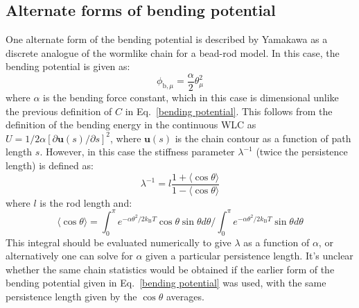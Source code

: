 \documentclass{article}
\begin{document}
\subsection{Alternate forms of bending potential}
One alternate form of the bending potential is described by Yamakawa \cite{Yamakawa2016} as a discrete analogue of the wormlike chain for a bead-rod model.
In this case, the bending potential is given as:
\begin{equation}
\label{bending potential discrete WLC}
    \phi_{\mathrm{b},\mu} = \frac{\alpha}{2} \theta_\mu^2
\end{equation}
where $\alpha$ is the bending force constant, which in this case is dimensional unlike the previous definition of $C$ in Eq.~\eqref{bending potential}.
This follows from the definition of the bending energy in the continuous WLC as $U = 1/2 \alpha [\partial \bm{u}(s)/\partial s]^2$, where $\bm{u}(s)$ is the chain contour as a function of path length $s$.
However, in this case the stiffness parameter $\lambda^{-1}$ (twice the persistence length) is defined as:
\begin{equation}
    \lambda^{-1}=l \frac{1+\langle\cos \theta\rangle}{1-\langle\cos \theta\rangle}
\end{equation}
where $l$ is the rod length and:
\begin{equation}
    \langle\cos {\theta}\rangle=\int_{0}^{\pi} e^{-\alpha {\theta}^{2} / 2 k_{\mathrm{B}} T} \cos {\theta} \sin {\theta} d {\theta} / \int_{0}^{\pi} e^{-\alpha {\theta}^{2} / 2 k_{\mathrm{B}} T} \sin {\theta} d {\theta}
\end{equation}
This integral should be evaluated numerically to give $\lambda$ as a function of $\alpha$, or alternatively one can solve for $\alpha$ given a particular persistence length. 
It's unclear whether the same chain statistics would be obtained if the earlier form of the bending potential given in Eq.~\eqref{bending potential} was used, with the same persistence length given by the $\cos \theta$ averages.
\end{document}
